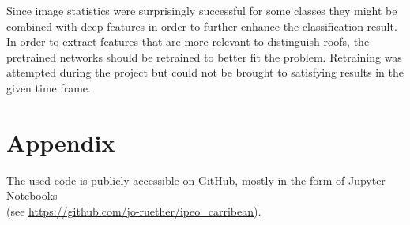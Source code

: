 \documentclass[11pt]{article}
\begin{document}
	Since image statistics were surprisingly successful for some classes they might be combined with deep features in order to further enhance the classification result.\\
	 
	In order to extract features that are more relevant to distinguish roofs, the pretrained networks should be retrained to better fit the problem. Retraining was attempted during the project but could not be brought to satisfying results in the given time frame.\\
	

	
	\section{Appendix}

	The used code is publicly accessible on GitHub, mostly in the form of Jupyter Notebooks \\
	(see \url{https://github.com/jo-ruether/ipeo_carribean}).
	
	 
	
\end{document}
